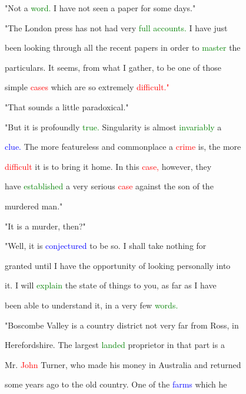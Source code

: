  "Not a \textcolor{green}{word.} I have not seen a paper for some days."



 "The London press has not had very \textcolor{green}{full} \textcolor{green}{accounts.} I have just

 been looking through all the recent papers in order to \textcolor{green}{master} the

 particulars. It seems, from what I gather, to be one of those

 simple \textcolor{red}{cases} which are so extremely \textcolor{red}{difficult."}



 "That sounds a little paradoxical."



 "But it is profoundly \textcolor{green}{true.} Singularity is almost \textcolor{green}{invariably} a

 \textcolor{blue}{clue.} The more featureless and \textcolor{BurntOrange}{commonplace} a \textcolor{red}{crime} is, the more

 \textcolor{red}{difficult} it is to bring it home. In this \textcolor{red}{case,} however, they

 have \textcolor{green}{established} a very serious \textcolor{red}{case} against the son of the

 \textcolor{BurntOrange}{murdered} man."



 "It is a \textcolor{BurntOrange}{murder,} then?"



 "Well, it is \textcolor{blue}{conjectured} to be so. I shall take nothing for

 \textcolor{BurntOrange}{granted} until I have the \textcolor{BurntOrange}{opportunity} of looking personally into

 it. I will \textcolor{green}{explain} the state of things to you, as far as I have

 been able to understand it, in a very few \textcolor{green}{words.}



 "Boscombe Valley is a country district not very far from Ross, in

 Herefordshire. The largest \textcolor{green}{landed} proprietor in that part is a

 Mr. \textcolor{red}{John} Turner, who made his \textcolor{BurntOrange}{money} in Australia and returned

 some years ago to the old country. One of the \textcolor{blue}{farms} which he

